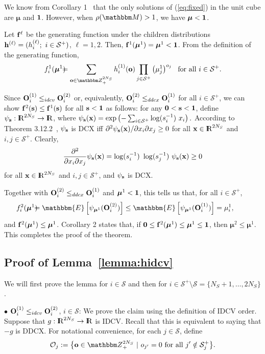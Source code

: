\documentclass[10pt, journal, compsoc]{IEEEtran}
\newcommand {\cO}{{\mathcal{O}}}
\newcommand {\cS}{{\mathcal{S}}}
\newcommand {\bM} {{\mathbbm M}}
\newcommand {\bO} {{\bf O}}
\newcommand {\bff} {{\bf f}}
\newcommand {\bh} {{\bf h}}
\newcommand {\bo} {{\bf o}}
\newcommand {\bs} {{\bf s}}
\newcommand {\bx} {{\bf x}}
\newcommand {\bmu} {\boldsymbol{\mu}}
\newcommand {\Z} {{\mathbbm Z}}
\newcommand {\R} {{\rm I\kern-2.5pt R}}
\newcommand{\beqan}{\begin{eqnarray*}}
\newcommand{\eeqan}{\end{eqnarray*}}
\newcommand{\myeq}{& \hspace{-0.1in} = & \hspace{-0.1in}}
\newcommand{\myhb}{\hspace{-0.3in}}
\begin{document}
We know from Corollary 1~\cite[p. 42]{Harris}
that the only solutions of (\ref{eq:fixed}) 
in the unit cube are $\boldsymbol{\mu}$ and 
${\bf 1}$. However, when $\rho(\bM) > 1$, 
we have $\boldsymbol{\mu} < {\bf 1}$. 

Let $\bff^\ell$ be the generating function 
under the children distributions $\bh^{(\ell)}
= (h^{(\ell)}_i; \ i \in \cS^+)$, 
$\ell = 1, 2$. Then, $\bff^1(\bmu^1) = \bmu^1 
< {\bf 1}$. From the definition of the generating 
function, 
\beqan
f^1_i(\bmu^1)
\myeq \sum_{\bo \in \Z^{2N_S}_+} h^{(1)}_i(\bo)
	\prod_{j \in \cS^+} \left( \mu^1_j \right)^{o_j}
		\ \mbox{ for all } i \in \cS^+.
\eeqan

Since ${\bf O}^{(1)}_i \leq_{idcv}{\bf O}^{(2)}_i$ or, 
equivalently, ${\bf O}^{(2)}_i \leq_{ddcx} 
{\bf O}^{(1)}_i$ for all $i \in \cS^+$, 
we can show $\bff^2(\bs) \leq \bff^1(\bs)$ for all $\bs
< {\bf 1}$ as follows: for any ${\bf 0} < \bs < {\bf 1}$, 
define $\psi_{\bs}: \R^{2 N_S} \to \R$, where 
$\psi_{\bs}(\bx)
= \exp\left( - \sum_{i \in \cS^+}\log(s_i^{-1}) 
	\ x_i \right).$
According to Theorem 3.12.2~\cite[p. 132]{MullerStoyan}, 
$\psi_{\bs}$ is DCX iff $\partial^2
\psi_{\bs}(\bx) / \partial x_i \partial x_j \geq 0$ 
for all $\bx \in \R^{2 N_S}$ and $i, j \in \cS^+$. 
Clearly, 
\beqan
\frac{\partial^2}{\partial x_i \partial x_j} 
	\psi_{\bs}(\bx) = \log(s_i^{-1}) \ 
		\log(s_j^{-1}) \ \psi_{\bs}(\bx) 
		\geq 0
\eeqan
for all $\bx \in \R^{2 N_S}$ and $i, j \in \cS^+$, 
and $\psi_{\bs}$ is DCX. 

Together with $\bO^{(2)}_i \leq_{ddcx} \bO^{(1)}_i$
and $\bmu^1 < {\bf 1}$, this tells us that, for all
$i \in \cS^+$, 
\beqan
\myhb f^2_i(\bmu^1)
\myeq \mathbbm{E}\left[ \psi_{\bmu^1}({\bf O}^{(2)}_i) \right]
\leq \mathbbm{E}\left[ \psi_{\bmu^1}({\bf O}^{(1)}_i) \right]
= \mu^1_i,
	\label{eq:appen1} 
\eeqan 
and $\bff^2(\bmu^1) \leq \bmu^1$. Corollary 2 
\cite[p. 42]{Harris} states that, if 
${\bf 0} \leq \bff^2(\bmu^1) \leq \bmu^1 \leq {\bf 1}$, 
then $\bmu^2 \leq \bmu^1$.  This completes the proof
of the theorem.




\subsection{Proof of Lemma~\ref{lemma:hidcv}}
	\label{appen:lemma-hidcv}


We will first prove the lemma for $i \in \cS$
and then for $i \in \cS^+ \setminus \cS
= \{N_S + 1, \ldots, 2 N_S\}$. 

$\bullet$ ${\bf O}^{(1)}_i \leq _{idcv} 
{\bf O}^{(2)}_i$, $i \in \cS$:
We prove the claim using the definition of 
IDCV order. 
Suppose that $g: \R^{2 N_S} \to \R$ is IDCV. 
Recall that this is equivalent to saying that
$-g$ is DDCX. For notational convenience, 
for each $j \in \cS$, define 
\beqan 
\cO_j 
:= \big\{ \bo \in \Z^{2N_S}_+ \ | \ o_{j'} = 0 \mbox{
	for all } j' \notin \cS^+_j \big\}.
\eeqan
\end{document}

